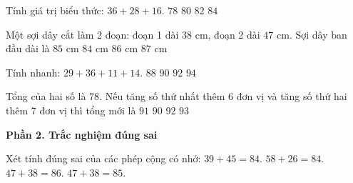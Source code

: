 \begin{ex} %
Tính giá trị biểu thức: $36 + 28 + 16$.
\choice
{$78$}
{\True $80$}
{$82$}
{$84$}
\end{ex}

\begin{ex} %
Một sợi dây cắt làm 2 đoạn: đoạn 1 dài $38\text{ cm}$, đoạn 2 dài $47\text{ cm}$. Sợi dây ban đầu dài là
\choice
{\True $85\text{ cm}$}
{$84\text{ cm}$}
{$86\text{ cm}$}
{$87\text{ cm}$}
\end{ex}

\begin{ex} %
Tính nhanh: $29 + 36 + 11 + 14$.
\choice
{$88$}
{\True $90$}
{$92$}
{$94$}
\end{ex}

\begin{ex} %
Tổng của hai số là 78. Nếu tăng số thứ nhất thêm 6 đơn vị và tăng số thứ hai thêm 7 đơn vị thì tổng mới là
\choice
{\True $91$}
{$90$}
{$92$}
{$93$}
\end{ex}

\textbf{Phần 2. Trắc nghiệm đúng sai}

\begin{ex} %
Xét tính đúng sai của các phép cộng có nhớ:
\choiceTF
{\True $39 + 45 = 84$.}
{\True $58 + 26 = 84$.}
{$47 + 38 = 86$.}
{\True $47 + 38 = 85$.}
\end{ex}

